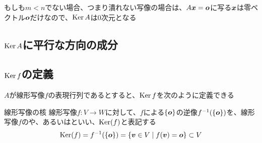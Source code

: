 \documentclass[../../../topic_linear-algebra]{subfiles}
\begin{document}
もしも$m < n$でない場合、つまり潰れない写像の場合は、$A\vb*{x} = \vb*{o}$に写る$\vb*{x}$は零ベクトル$\vb*{o}$だけなので、$\operatorname{Ker} A$は0次元となる

\subsection{$\operatorname{Ker} A$に平行な方向の成分}


\subsection{$\operatorname{Ker} f$の定義}

$A$が線形写像$f$の表現行列であるとすると、$\operatorname{Ker} f$を次のように定義できる

\begin{definition}{線形写像の核}
  線形写像$f\colon V \to W$に対して、$f$による$\{\vb*{o}\}$の逆像$f^{-1}(\{\vb*{o}\})$を、線形写像$f$のや、あるいはといい、$\operatorname{Ker}(f)$と表記する
  \begin{equation*}
    \operatorname{Ker}(f) = f^{-1}(\{\vb*{o}\}) = \{ \vb*{v} \in V \mid f(\vb*{v}) = \vb*{o} \} \subset V
  \end{equation*}
\end{definition}
\end{document}

